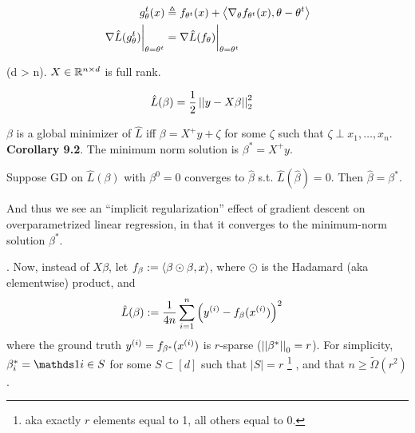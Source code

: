 \documentclass[11pt]{article}
\begin{document}
\begin{align}
	g_{\theta}^t(x)
		&\triangleq f_{\theta^t}(x) + \innerprod{\nabla_{\theta} f_{\theta^t}(x)}{ \theta - \theta^t} \\
	\nabla \hat L(g_{\theta}^t) \bigg|_{\theta=\theta^t} 
		&= \nabla \hat L (f_{\theta}) \bigg|_{\theta=\theta^t}
\end{align}












 (d > n).  $X \in \R^{n \times d}$ is full rank. 

\begin{align}
	\hat L(\beta) 
		&= \onehalf \norm{y - X \beta}^2
\end{align}

\begin{definition}[-1em][Lemma 9.1]
	$\beta$ is a global minimizer of $\hat L$ iff $\beta = X^{+}y + \zeta$ for some $\zeta$ such that $\zeta \perp x_1, \ldots, x_n$. \\
	
	\textbf{Corollary 9.2}. The minimum norm solution is $\beta^* = X^{+} y$. 
\end{definition}

\begin{definition}[-1em][Theorem 9.3]
	Suppose GD on $\hat L(\beta)$ with $\beta^0 = 0$ converges to $\hat \beta$ s.t. $\hat L(\hat \beta) = 0$. Then $\hat \beta = \beta^*$. 
\end{definition}

And thus we see an ``implicit regularization'' effect of gradient descent on overparametrized linear regression, in that it converges to the minimum-norm solution $\beta^*$. 

. Now, instead of $X\beta$, let $f_{\beta} := \innerprod{\beta \odot \beta}{x}$, where $\odot$ is the Hadamard (aka elementwise) product, and
\begin{align}
	\hat L(\beta) &:= \inv{4n} \insum \lr{\ival[i]{y} - f_{\beta}(\ival[i]{x})}^2
\end{align}
where the ground truth $\ival[i]{y} = f_{\beta^*}(\ival[i]{x})$ is $r$-sparse ($\norm[0]{\beta^*} = r$). For simplicity,  $\beta_i^* = \ind{i \in S}$ for some $S \subset [d]$ such that $|S| = r$ \footnote{aka exactly $r$ elements equal to 1, all others equal to 0.} , and that $n \geq \widetilde\Omega(r^2)$. 
\end{document}
